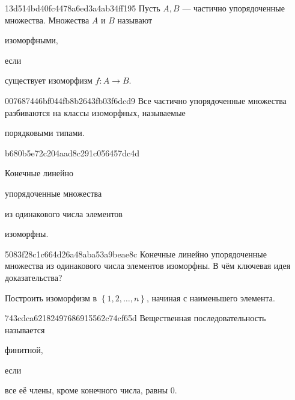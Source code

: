\begin{note}{13d514bd40fc4478a6ed3a4ab34ff195}
    Пусть \({ A, B }\) --- частично упорядоченные множества.
    Множества \({ A }\) и \({ B }\) называют \begin{icloze}{2}изоморфными,\end{icloze} если \begin{icloze}{1}существует изоморфизм \({ f : A \to B }\).\end{icloze}
\end{note}

\begin{note}{007687446bf044fb8b2643fb03f6dcd9}
    Все частично упорядоченные множества разбиваются на классы изоморфных, называемые \begin{icloze}{1}порядковыми типами.\end{icloze}
\end{note}

\begin{note}{b680b5e72c204aad8c291c056457dc4d}
    \begin{icloze}{1}Конечные линейно\end{icloze} упорядоченные множества \begin{icloze}{2}из одинакового числа элементов\end{icloze} \begin{icloze}{3}изоморфны.\end{icloze}
\end{note}

\begin{note}{5083f28c1c664d26a48aba53a9beae8c}
    Конечные линейно упорядоченные множества из одинакового числа элементов изоморфны.
    В чём ключевая идея доказательства?

    \begin{cloze}{1}
        Построить изоморфизм в \({ \left\{ 1, 2, \ldots, n \right\} }\), начиная с наименьшего элемента.
    \end{cloze}
\end{note}

\begin{note}{743cdca62182497686915562c74cf65d}
    Вещественная последовательность называется \begin{icloze}{2}финитной,\end{icloze} если \begin{icloze}{1}все её члены, кроме конечного числа, равны \({ 0 }\).\end{icloze}
\end{note}

